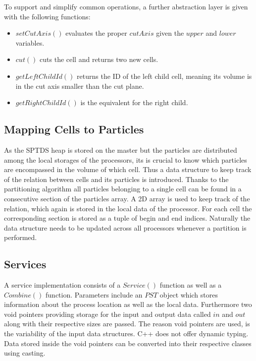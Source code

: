 \documentclass[]{article}
\begin{document}
To support and simplify common operations, a further abstraction layer is given with the following functions:


\begin{itemize}
	\item $setCutAxis()$ evaluates the proper $cutAxis$ given the $upper$ and $lower$ variables.
	\item $cut()$ cuts the cell and returns two new cells. 
	\item $getLeftChildId()$ returns the ID of the left child cell, meaning its volume is in the cut axis smaller than the cut plane. 
	\item $getRightChildId()$ is the equivalent for the right child. 
\end{itemize} 

\subsection{Mapping Cells to Particles}

As the SPTDS heap is stored on the master but the particles are distributed among the local storages of the processors, its is crucial to know which particles are encompassed in the volume of which cell. Thus a data structure to keep track of the relation between cells and its particles is introduced.
Thanks to the partitioning algorithm all particles belonging to a single cell can be found in a consecutive section of the particles array. A 2D array is used to keep track of the relation, which again is stored in the local data of the processor. For each cell the corresponding section is stored as a tuple of begin and end indices. Naturally the data structure needs to be updated across all processors whenever a partition is performed.

\subsection{Services}\label{services}

A service implementation consists of a $Service()$ function as well as a $Combine()$ function. Parameters include an $PST$ object which stores information about the process location as well as the local data. Furthermore two void pointers providing storage for the input and output data called $in$ and $out$ along with their respective sizes are passed. The reason void pointers are used, is the variability of the input data structures. C++ does not offer dynamic typing. Data stored inside the void pointers can be converted into their respective classes using casting. 
\end{document}
